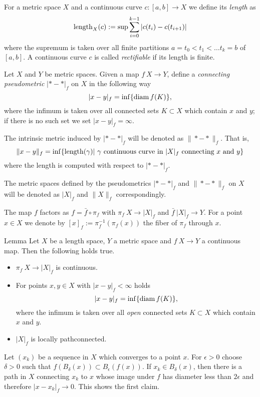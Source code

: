 \documentclass[a4paper,10pt]{amsart}
\begin{document}
For a metric space $X$ and a continuous curve $c:[a,b]\to X$ we define its {\em length} as
\[\mathop{\rm length}\nolimits_X(c):=\sup\sum_{i=0}^{k-1} |c(t_i)-c(t_{i+1})|\]
where the supremum is taken over all finite partitions ${a=t_0<t_1<\ldots t_k=b}$ of $[a,b]$. 
A continuous curve $c$ is called {\em rectifiable} if its length is finite.







Let $X$ and $Y$ be metric spaces.
Given a map $f\:X\to Y$,
define a \emph{connecting pseudometric} $|{*}-{*}|_f$ on $X$ in
the following way
\[|x-y|_f=\inf\{\mathop{\rm diam}\nolimits f(K)\},\]
where the infimum is taken over all connected sets $K\subset X$ which contain $x$ and $y$;
if there is no such set we set $|x-y|_f=\infty$.

The intrinsic metric induced by $|{*}-{*}|_f$ will be denoted as 
$\|{*}-{*}\|_f$. 
That is, 
\[\|x-y\|_f=\inf\{\length(\gamma)|\ \gamma \text{ continuous curve in } |X|_f \text{ connecting } x \text{ and } y\}\]
where the length is computed with respect to $|{*}-{*}|_f$.

The metric spaces defined by the pseudometrics $|{*}-{*}|_f$ 
and $\|{*}-{*}\|_f$ on $X$ will be denoted as $|X|_f$ and $\|X\|_f$ correspondingly.

\medskip

The map $f$ factors as $f=\bar f\circ \pi_f$ with $\pi_f\:X\to|X|_f$ and $\bar f\:|X|_f\to Y$.
For a point $x\in X$ we denote by $[x]_f:=\pi_f^{-1}(\pi_f(x))$ the fiber of $\pi_f$ through $x$.

\begin{thm}{Lemma}\label{lem:picont}
Let $X$ be a length space, $Y$ a metric space and $f\:X\to Y$ a continuous map. Then the following holds true.
\begin{itemize}
 \item $\pi_f\:X\to|X|_f$ is continuous.
 \item For points $x,y\in X$ with $|x-y|_f<\infty$ holds
\[|x-y|_f=\inf\{\mathop{\rm diam}\nolimits f(K)\},\]
where the infimum is taken over all {\em open} connected sets $K\subset X$ which contain $x$ and $y$.
  \item $|X|_f$ is locally pathconnected.
\end{itemize}

\end{thm}
Let $(x_k)$ be a sequence in $X$ which converges to a point $x$. For $\epsilon>0$ choose $\delta>0$ such that
$f(B_\delta(x))\subset B_\epsilon(f(x))$. If $x_k\in B_\delta(x)$, then there is a path in $X$ connecting $x_k$
to $x$ whose image under $f$ has diameter less than $2\epsilon$ and therefore $|x-x_k|_f\to 0$. This shows the first claim.
\end{document}
